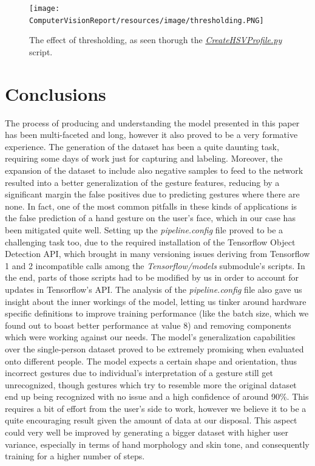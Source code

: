 \documentclass[a4paper, 12pt]{article}
\begin{document}
\begin{flushleft}
\begin{figure}[!h]
    \centering
    \texttt{[image: ComputerVisionReport/resources/image/thresholding.PNG]} \caption{The effect of thresholding, as seen thorugh the \textit{\href{https://github.com/MarzioVallero/ML-Based-Blender-Gestural-Input-Interface/blob/master/CreateHSVProfile.py}{CreateHSVProfile.py}} script.}
\end{figure}
\label{figure6}

\end{flushleft}

\section{Conclusions}
\begin{flushleft}
The process of producing and understanding the model presented in this paper has been multi-faceted and long, however it also proved to be a very formative experience.\linebreak
The generation of the dataset has been a quite daunting task, requiring some days of work just for capturing and labeling. Moreover, the expansion of the dataset to include also negative samples to feed to the network resulted into a better generalization of the gesture features, reducing by a significant margin the false positives due to predicting gestures where there are none. In fact, one of the most common pitfalls in these kinds of applications is the false prediction of a hand gesture on the user's face, which in our case has been mitigated quite well.\linebreak
Setting up the \textit{pipeline.config} file proved to be a challenging task too, due to the required installation of the Tensorflow Object Detection API, which brought in many versioning issues deriving from Tensorflow 1 and 2 incompatible calls among the \textit{Tensorflow/models} submodule's scripts. In the end, parts of those scripts had to be modified by us in order to account for updates in Tensorflow's API.\linebreak
The analysis of the \textit{pipeline.config} file also gave us insight about the inner workings of the model, letting us tinker around hardware specific definitions to improve training performance (like the batch size, which we found out to boast better performance at value 8) and removing components which were working against our needs.\linebreak
The model's generalization capabilities over the single-person dataset proved to be extremely promising when evaluated onto different people. The model expects a certain shape and orientation, thus incorrect gestures due to individual's interpretation of a gesture still get unrecognized, though gestures which try to resemble more the original dataset end up being recognized with no issue and a high confidence of around 90\%. This requires a bit of effort from the user's side to work, however we believe it to be a quite encouraging result given the amount of data at our disposal. This aspect could very well be improved by generating a bigger dataset with higher user variance, especially in terms of hand morphology and skin tone, and consequently training for a higher number of steps.\linebreak

\end{flushleft}
\end{document}
